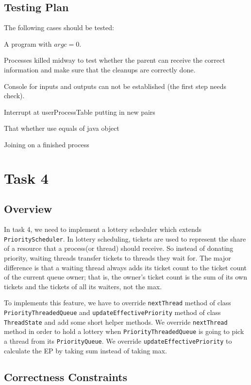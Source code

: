 \documentclass{article}
\begin{document}
\begin{spacing}{1.1}
\subsection{Testing Plan}
The following cases should be tested:
\begin{asparaitem}
  \item A program with $argc=0$.
  \item Processes killed midway to test whether the parent can receive the correct information and make sure that the cleanups are correctly done.
  \item Console for inputs and outputs can not be established (the first step needs check).
  \item Interrupt at userProcessTable putting in new pairs
  \item That whether use equals of java object
  \item Joining on a finished process
\end{asparaitem}


\section{Task 4}

\subsection{Overview}
In task 4, we need to implement a lottery scheduler which extends \texttt{PriorityScheduler}. In lottery scheduling, tickets are used to represent the share of a resource that a process(or thread) should receive. So instead of donating priority, waiting threads transfer tickets to threads they wait for. The major difference is that a waiting thread always adds its ticket count to the ticket count of the current queue owner; that is, the owner's ticket count is the sum of its own tickets and the tickets of all its waiters, not the max.

To implements this feature, we have to override \texttt{nextThread} method of class \texttt{PriorityThreadedQueue} and \texttt{updateEffectivePriority} method of class \texttt{ThreadState} and add some short helper methods. We override \texttt{nextThread} method in order to hold a lottery when \texttt{PriorityThreadedQueue} is going to pick a thread from its \texttt{PriorityQueue}. We override \texttt{updateEffectivePriority} to calculate the EP by taking sum instead of taking max.

\subsection{Correctness Constraints}


\end{spacing}
\end{document}
